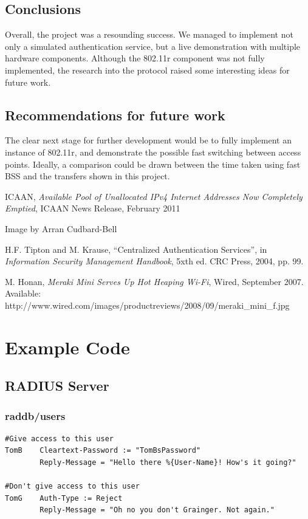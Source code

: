 \documentclass[12pt,a4paper,titlepage]{article}
\begin{document}
\subsection{Conclusions}
Overall, the project was a resounding success. We managed to implement not only a simulated authentication service, but a live demonstration with multiple hardware components. Although the 802.11r component was not fully implemented, the research into the protocol raised some interesting ideas for future work.

\subsection{Recommendations for future work}
The clear next stage for further development would be to fully implement an instance of 802.11r, and demonstrate the possible fast switching between access points. Ideally, a comparison could be drawn between the time taken using fast BSS and the transfers shown in this project.

\newpage
\begin{thebibliography}{99}

 ICAAN, \textit{Available Pool of Unallocated IPv4 Internet Addresses Now Completely Emptied}, ICAAN News Release, February 2011

 Image by Arran Cudbard-Bell

H.F. Tipton and M. Krause, ``Centralized Authentication Services'', in \textit{Information Security Management Handbook}, 5xth ed. CRC Press, 2004, pp. 99.

M. Honan, \textit{Meraki Mini Serves Up Hot Heaping Wi-Fi}, Wired, September 2007. Available: http://www.wired.com/images/productreviews/2008/09/meraki\_mini\_f.jpg

\end{thebibliography}

\newpage
\appendix
\section{Example Code}

\subsection{RADIUS Server}
\label{sec:Code;sub:radius}

\subsubsection{raddb/users}
\begin{Verbatim}[frame=single]
#Give access to this user
TomB    Cleartext-Password := "TomBsPassword"
        Reply-Message = "Hello there %{User-Name}! How's it going?"

#Don't give access to this user
TomG    Auth-Type := Reject
        Reply-Message = "Oh no you don't Grainger. Not again."
\end{Verbatim}
\end{document}

